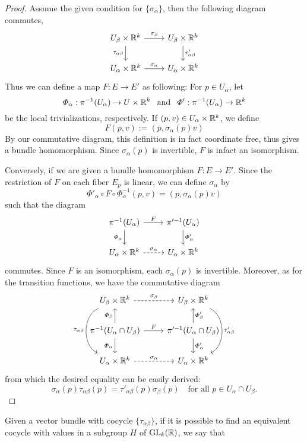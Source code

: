 \begin{proof}
Assume the given condition for $\{\sigma_\alpha\}$, then the following diagram commutes,
\[\begin{tikzcd}
U_\beta\times\R^k\ar[r,"\sigma_\beta"]\ar[d,swap,"\tau_{\alpha\beta}"]&U_\beta\times\R^k\ar[d,"\tau'_{\alpha\beta}"]\\
U_\alpha\times\R^k\ar[r,"\sigma_\alpha"]&U_\alpha\times\R^k
\end{tikzcd}\]
Thus we can define a map $F:E\to E'$ as following: For $p\in U_\alpha$, let \[\varPhi_\alpha:\pi^{-1}(U_\alpha)\to U\times\mathbb{R}^k\hspace{8pt}\text{and}\hspace{8pt}\varPhi':\pi^{-1}(U_\alpha)\to\mathbb{R}^k\] 
be the local trivializations, respectively. If $(p,v)\in U_\alpha\times\mathbb{R}^k$, we define
\[F(p,v):=(p,\sigma_\alpha(p)v)\]
By our commutative diagram, this definition is in fact coordinate free, thus gives a bundle homomorphism. Since $\sigma_\alpha(p)$ is invertible, $F$ is infact an isomorphism.\par
Conversely, if we are given a bundle homomorphism $F:E\to E'$. Since the restriction of $F$ on each fiber $E_p$ is linear, we can define $\sigma_\alpha$ by
\[\varPhi'_\alpha\circ F\circ\varPhi_\alpha^{-1}(p,v)=(p,\sigma_\alpha(p)v)\]
such that the diagram
\[\begin{tikzcd}
\pi^{-1}(U_\alpha)\ar[d,swap,"\varPhi_\alpha"]\ar[r,"F"]&\pi'^{-1}(U_\alpha)\ar[d,"\varPhi'_\alpha"]\\
U_\alpha\times\R^k\ar[r,dashed,"\sigma_\alpha"]&U_\alpha\times\R^k
\end{tikzcd}\]
commutes. Since $F$ is an isomorphism, each $\sigma_\alpha(p)$ is invertible. Moreover, as for the transition functions, we have the commutative diagram
\[\begin{tikzcd}
U_\beta\times\R^k\ar[r,dashed,"\sigma_\beta"]\ar[dd,bend right=65,swap,"\tau_{\alpha\beta}"]&U_\beta\times\R^k\ar[dd,bend left=65,"\tau'_{\alpha\beta}"]\\
\pi^{-1}(U_\alpha\cap U_\beta)\ar[d,swap,"\varPhi_\alpha"]\ar[u,"\varPhi_\beta"]\ar[r,"F"]&\pi'^{-1}(U_\alpha\cap U_\beta)\ar[d,"\varPhi'_\alpha"]\ar[u,swap,"\varPhi'_\beta"]\\
U_\alpha\times\R^k\ar[r,dashed,"\sigma_\alpha"]&U_\alpha\times\R^k
\end{tikzcd}\]
from which the desired equality can be easily derived:
\[\sigma_\alpha(p)\tau_{\alpha\beta}(p)=\tau'_{\alpha\beta}(p)\sigma_\beta(p)\quad\text{for all }p\in U_\alpha\cap U_\beta.\]
\end{proof}
Given a vector bundle with cocycle $\{\tau_{\alpha\beta}\}$, if it is possible to find an equivalent cocycle with values in a subgroup $H$ of $\mathrm{GL}_k(\mathbb{R})$, we say that 
